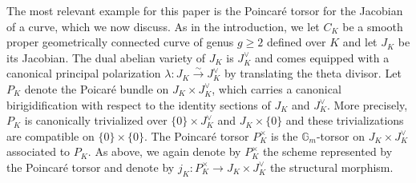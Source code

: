 \documentclass[11pt,oneside]{amsart}
\theoremstyle{plain}
\theoremstyle{definition}
\def\lra{{\longrightarrow}}
\def\G{{\bf G}}
\def\G{\mathbb{G}}
\def\oh{\mathcal{O}}
\begin{document}
The most relevant example for this paper is the Poincar\'e torsor for the Jacobian of a curve, which we now discuss. As in the introduction, we let $C_K$ be a smooth proper geometrically connected curve of genus $g\geq 2$ defined over $K$ and let $J_K$ be its Jacobian. The dual abelian variety of $J_K$ is  $J_K^\vee$ and comes equipped with a canonical principal polarization $\lambda : J_K\overset{\sim}{\lra} J_K^\vee$ by translating the theta divisor. 
Let $P_K$ denote the Poicar\'e bundle on $J_K\times J_K^\vee$, which carries a canonical birigidification with respect to the identity sections of $J_K$ and $J_K^\vee$. More precisely, $P_K$ is canonically trivialized over $\{0 \}\times J_K^\vee$ and $J_K\times \{ 0 \}$ and these trivializations are compatible on $\{0 \}\times\{0 \}$. The Poincar\'e torsor $P_K^\times$ is the $\G_m$-torsor on $J_K\times J_K^\vee$ associated to $P_K$. As above, we again denote by $P_K^\times$ the scheme represented by the Poincar\'e torsor and  denote by $j_K : P_K^\times \lra J_K\times J_K^\vee$ the structural morphism.

\end{document}
